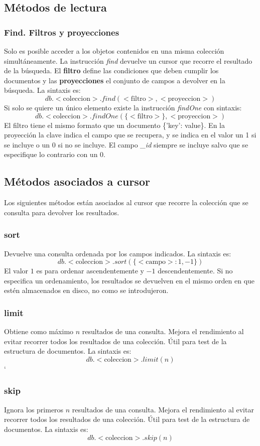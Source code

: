 \subsection{Métodos de lectura} 	
\subsubsection{Find. Filtros y proyecciones}
Solo es posible acceder a los objetos contenidos en una misma colección simultáneamente. La instrucción \textit{find} devuelve un cursor que recorre el resultado de la búsqueda. El \textbf{filtro} define las condiciones que deben cumplir los documentos y las \textbf{proyecciones} el conjunto de campos a devolver en la búsqueda. La sintaxis es:
$$db.<\textrm{coleccion}>.find(<\textrm{filtro}>, <\textrm{proyeccion}>)$$
Si solo se quiere un único elemento existe la instrucción \textit{findOne} con sintaxis:
$$db.<\textrm{coleccion}>.findOne(\{<\textrm{filtro}>\}, <\textrm{proyeccion}>)$$
El filtro tiene el mismo formato que un documento \{'key': value\}. En la proyección la clave indica el campo que se recupera, y se indica en el valor un 1 si se incluye o un 0 si no se incluye. El campo \textit{\_id} siempre se incluye salvo que se especifique lo contrario con un 0.
\subsection{Métodos asociados a cursor}
Los siguientes métodos están asociados al cursor que recorre la colección que se consulta para devolver los resultados.
\subsubsection{sort}
Devuelve una consulta ordenada por los campos indicados. La sintaxis es:
$$db.<\textrm{coleccion}>.sort(\{<\textrm{campo}>: 1, -1\})$$
El valor $1$ es para ordenar ascendentemente y $-1$ descendentemente.  Si no especifica un ordenamiento, los resultados se devuelven en el mismo orden en que estén almacenados en disco, no como se introdujeron.
\subsubsection{limit}
Obtiene como máximo $n$ resultados de una consulta. Mejora el rendimiento al evitar recorrer todos los resultados de una colección. Útil para test de la estructura de documentos. La sintaxis es:
$$db.<\textrm{coleccion}>.limit(n)$$`
\subsubsection{skip}
Ignora los primeros $n$ resultados de una consulta. Mejora el rendimiento al evitar recorrer todos los resultados de una colección. Útil para test de la estructura de documentos. La sintaxis es:
$$db.<\textrm{coleccion}>.skip(n)$$

